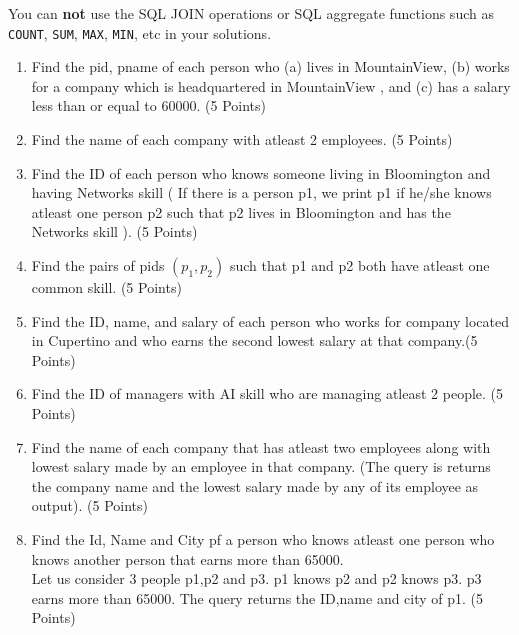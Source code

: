 \documentclass{article}
\begin{document}
 You can {\bf not} use the SQL JOIN operations or SQL aggregate functions
such as {\tt COUNT}, {\tt SUM}, {\tt MAX}, {\tt MIN}, etc in your solutions.
\begin{enumerate}[resume]
\item Find the pid, pname of each person who (a) lives in MountainView, (b) works for a company which is headquartered in MountainView , and (c) has a salary less than or equal to 60000. (5 Points)

\item Find the name of each company with atleast 2 employees. (5 Points)

\item Find the ID of each person who knows someone living in Bloomington and having Networks skill ( If there is a person p1, we print p1 if he/she knows atleast one person p2 such that p2 lives in Bloomington and has the Networks skill ). (5 Points)

\item Find the pairs of pids $(p_1, p_2)$ such that p1 and p2 both have atleast one common skill. (5 Points)

\item Find the ID, name, and salary of each person who works for company located in Cupertino and who earns the second lowest salary  at that company.(5 Points)

\item Find the ID of managers with AI skill who are managing atleast 2 people. (5 Points)

\item Find the name of each company that has atleast two employees along with lowest salary made by an employee in that company. (The query is returns the company name and the lowest salary made by any of its employee as output). (5 Points)

\item 
Find the Id, Name and City pf a person who knows atleast one person who knows another person that earns more than 65000.\\
Let us consider 3 people p1,p2 and p3. p1 knows p2 and p2 knows p3. p3 earns more than 65000. The query returns the ID,name and city of p1. (5 Points)


\end{enumerate}
\end{document}
